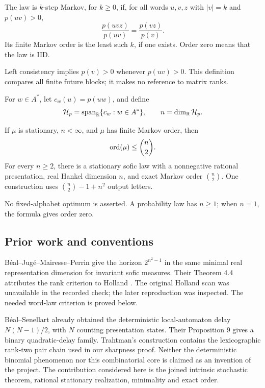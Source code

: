 \begin{definition}
The law is \(k\)-step Markov, for \(k\ge0\), if, for all words \(u,v,z\) with \(|v|=k\) and \(p(uv)>0\),
\begin{equation}\label{eq:conditional}
 \frac{p(uvz)}{p(uv)}=\frac{p(vz)}{p(v)}.
\end{equation}
Its finite Markov order is the least such \(k\), if one exists. Order zero means that the law is IID.
\end{definition}
Left consistency implies \(p(v)>0\) whenever \(p(uv)>0\). This definition compares all finite future blocks; it makes no reference to matrix ranks.

For \(w\in A^*\), let \(c_w(u)=p(uw)\), and define
\[
 \mathcal H_p=\operatorname{span}_{\mathbb R}\{c_w:w\in A^*\},\qquad n=\dim_{\mathbb R}\mathcal H_p.
\]
\begin{theorem}\label{thm:main}
If \(\mu\) is stationary, \(n<\infty\), and \(\mu\) has finite Markov order, then
\[
 \operatorname{ord}(\mu)\le\binom n2.
\]
For every \(n\ge2\), there is a stationary sofic law with a nonnegative rational presentation, real Hankel dimension \(n\), and exact Markov order \(\binom n2\). One construction uses \(\binom n2-1+n^2\) output letters.
\end{theorem}
No fixed-alphabet optimum is asserted. A probability law has \(n\ge1\); when \(n=1\), the formula gives order zero.

\subsection{Prior work and conventions}
B\'eal--Jug\'e--Mairesse--Perrin \cite[Theorem 5.1]{BJMP2026} give the horizon \(2^{n^2-1}\) in the same minimal real representation dimension for invariant sofic measures. Their Theorem 4.4 attributes the rank criterion to Holland \cite{Holland1968}. The original Holland scan was unavailable in the recorded check; the later reproduction was inspected. The needed word-law criterion is proved below.

B\'eal--Senellart \cite[Proposition 3]{BS1998} already obtained the deterministic local-automaton delay \(N(N-1)/2\), with \(N\) counting presentation states. Their Proposition 9 gives a binary quadratic-delay family. Trahtman's construction \cite[Section 6]{Trahtman1998} contains the lexicographic rank-two pair chain used in our sharpness proof. Neither the deterministic binomial phenomenon nor this combinatorial core is claimed as an invention of the project. The contribution considered here is the joined intrinsic stochastic theorem, rational stationary realization, minimality and exact order.

